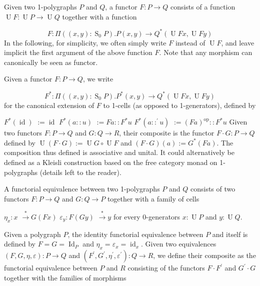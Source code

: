 \documentclass[10pt,a4paper]{amsart}
\begin{document}
Given two 1-polygraphs $P$ and $Q$, a functor $F:P\to Q$ consists of a function $\operatorname{U}F:\operatorname{U}P\to\operatorname{U}Q$ together with a function\par
    \[F:\Pi((x,y):\operatorname{S}_{0}P).P(x,y)\to Q^{*}(\operatorname{U}Fx,\operatorname{U}Fy)\]    
In the following, for simplicity, we often simply write $F$ instead of $\operatorname{U}F$, and leave implicit the first argument of the above function $F$. Note that any morphism can canonically be seen as functor.\par
 
 
 
Given a functor $F:P\to Q$, we write\par
    \[F^{*}:\Pi((x,y):\operatorname{S}_{0}P).P^{*}(x,y)\to Q^{*}(\operatorname{U}Fx,\operatorname{U}Fy)\]    
for the canonical extension of $F$ to 1-cells (as opposed to 1-generators), defined by\par
    $\displaystyle F^{*}(\operatorname{id})$ $\displaystyle:=\operatorname{id}$ $\displaystyle F^{*}(a::u)$ $\displaystyle:=Fa::F^{*}u$ $\displaystyle F^{*}(a::^{\prime}u)$ $\displaystyle:=(Fa)^{\mathrm{op}}::F^{*}u$    
Given two functors $F:P\to Q$ and $G:Q\to R$, their composite is the functor $F\cdot{}G:P\to Q$ defined by $\operatorname{U}(F\cdot{}G):=\operatorname{U}G\circ\operatorname{U}F$ and $(F\cdot{}G)(a):=G^{*}(Fa)$. The composition thus defined is associative and unital. It could alternatively be defined as a Kleisli construction based on the free category monad on 1-polygraphs (details left to the reader).\par
 
 
 
A functorial equivalence between two 1-polygraphs $P$ and $Q$ consists of two functors $F:P\to Q$ and $G:Q\to P$ together with a family of cells\par
    $\displaystyle\eta_{x}:x$ $\displaystyle\overset{*}{\to}G(Fx)$ $\displaystyle\varepsilon_{y}:F(Gy)$ $\displaystyle\overset{*}{\to}y$    
for every 0-generators $x:\operatorname{U}P$ and $y:\operatorname{U}Q$.\par
 
 
 
Given a polygraph $P$, the identity functorial equivalence between $P$ and itself is defined by $F=G=\operatorname{Id}_{P}$ and $\eta_{x}=\varepsilon_{x}=\operatorname{id}_{x}$. Given two equivalences $(F,G,\eta,\varepsilon):P\to Q$ and $(F^{\prime},G^{\prime},\eta^{\prime},\varepsilon^{\prime}):Q\to R$, we define their composite as the functorial equivalence between $P$ and $R$ consisting of the functors $F\cdot{}F^{\prime}$ and $G^{\prime}\cdot{}G$ together with the families of morphisms\par
     
\end{document}

